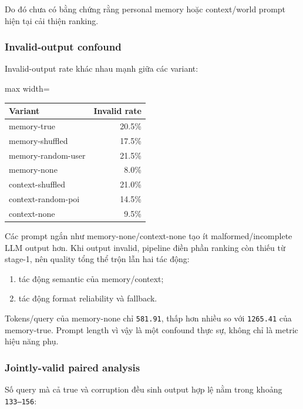 Do đó chưa có bằng chứng rằng personal memory hoặc context/world prompt hiện tại cải thiện ranking.

\subsubsection*{Invalid-output confound}

Invalid-output rate khác nhau mạnh giữa các variant:

\begin{table}[!htbp]
\centering
\scriptsize
\setlength{\tabcolsep}{2.5pt}
\begin{adjustbox}{max width=\textwidth}
\begin{tabular}{@{}lr@{}}
\toprule
Variant & Invalid rate \\
\midrule
memory-true & 20.5\% \\
memory-shuffled & 17.5\% \\
memory-random-user & 21.5\% \\
memory-none & 8.0\% \\
context-shuffled & 21.0\% \\
context-random-poi & 14.5\% \\
context-none & 9.5\% \\
\bottomrule
\end{tabular}
\end{adjustbox}
\end{table}

Các prompt ngắn như memory-none/context-none tạo ít malformed/incomplete LLM output hơn. Khi output invalid, pipeline điền phần ranking còn thiếu từ stage-1, nên quality tổng thể trộn lẫn hai tác động:

\begin{enumerate}
\item tác động semantic của memory/context;
\item tác động format reliability và fallback.
\end{enumerate}

Tokens/query của memory-none chỉ \texttt{581.91}, thấp hơn nhiều so với \texttt{1265.41} của memory-true. Prompt length vì vậy là một confound thực sự, không chỉ là metric hiệu năng phụ.

\subsubsection*{Jointly-valid paired analysis}

Số query mà cả true và corruption đều sinh output hợp lệ nằm trong khoảng \texttt{133--156}:

